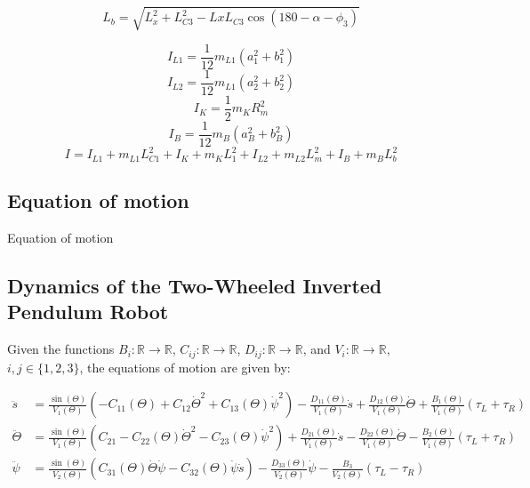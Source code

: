 	\begin{equation}
		L_b = \sqrt{L_{x}^2 + L_{C3}^2 - Lx L_{C3} \cos(180 - \alpha - \phi_3 )}
	\end{equation}
	
	\begin{equation}
		I_{L1} = \frac{1}{12} m_{L1} (a_1^2 + b_1^2)
	\end{equation}
	\begin{equation}
		I_{L2} = \frac{1}{12} m_{L1} (a_2^2 + b_2^2)
	\end{equation}
	\begin{equation}
		I_K = \frac{1}{2} m_K R_m^2
	\end{equation}
	\begin{equation}
		I_B = \frac{1}{12} m_B (a_B^2 + b_B^2)
	\end{equation}
	\begin{equation}
		I = I_{L1} + m_{L1} L_{C1}^2 + I_K + m_K L_1^2 + I_{L2} + m_{L2} L_m^2 + I_B + m_B L_b^2
	\end{equation}
	
	\subsection{Equation of motion }
	Equation of motion 
	
	
	
	
	
	
	\subsection{Dynamics of the Two-Wheeled Inverted Pendulum Robot}
	Given the functions $B_i: \mathbb{R} \rightarrow \mathbb{R}$, $C_{ij}: \mathbb{R} \rightarrow \mathbb{R}$, $D_{ij}: \mathbb{R} \rightarrow \mathbb{R}$, and $V_i: \mathbb{R} \rightarrow \mathbb{R}$, $i,j \in \{1,2,3\}$, the equations of motion are given by:
	
	\begin{align}
		\ddot{s} &= \frac{\sin(\Theta)}{V_1(\Theta)} \left( -C_{11}(\Theta) + C_{12}\dot{\Theta}^2 + C_{13}(\Theta)\dot{\psi}^2 \right) - \frac{D_{11}(\Theta)}{V_1(\Theta)}\dot{s} + \frac{D_{12}(\Theta)}{V_1(\Theta)}\dot{\Theta} + \frac{B_{1}(\Theta)}{V_1(\Theta)}(\tau_L + \tau_R) \\
		\ddot{\Theta} &= \frac{\sin(\Theta)}{V_1(\Theta)} \left( C_{21} - C_{22}(\Theta)\dot{\Theta}^2 - C_{23}(\Theta)\dot{\psi}^2 \right) + \frac{D_{21}(\Theta)}{V_1(\Theta)}\dot{s} - \frac{D_{22}(\Theta)}{V_1(\Theta)}\dot{\Theta} - \frac{B_{2}(\Theta)}{V_1(\Theta)}(\tau_L + \tau_R)  \\
		\ddot{\psi} &= \frac{\sin(\Theta)}{V_2(\Theta)} \left( C_{31}(\Theta)\dot{\Theta}\dot{\psi} - C_{32}(\Theta)\dot{\psi}\dot{s} \right) - \frac{D_{33}(\Theta)}{V_2(\Theta)}\dot{\psi} - \frac{B_{3}}{V_2(\Theta)}(\tau_L - \tau_R)
	\end{align}
	
